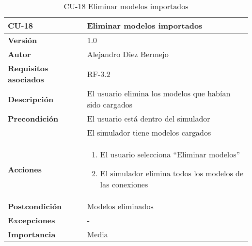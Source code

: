 \begin{table}[p]
	\centering
	\begin{tabularx}{\linewidth}{ p{} p{} }
		\toprule
		\textbf{CU-18}    & \textbf{Eliminar modelos importados}\\
		\toprule
		\textbf{Versión}              & 1.0    \\
		\textbf{Autor}                & Alejandro Diez Bermejo \\
		\textbf{Requisitos asociados} & RF-3.2 \\
		\textbf{Descripción}          & El usuario elimina los modelos que habían sido cargados \\
        \textbf{Precondición}         & El usuario está dentro del simulador \\
                                      & El simulador tiene modelos cargados \\
		\textbf{Acciones}             &
		\begin{enumerate}
			\def\labelenumi{\arabic{enumi}.}
			\tightlist
			\item El usuario selecciona ``Eliminar modelos''
            \item El simulador elimina todos los modelos de las conexiones
		\end{enumerate}\\
		\textbf{Postcondición}        & Modelos eliminados \\
		\textbf{Excepciones}          & - \\
		\textbf{Importancia}          & Media \\
		\bottomrule
	\end{tabularx}
	\caption{CU-18 Eliminar modelos importados}
\end{table}

